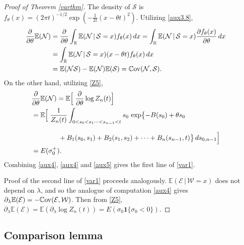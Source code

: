 \documentclass[11pt]{amsart}
\numberwithin{equation}{section}
\theoremstyle{remark}
\begin{document}
\begin{proof}[Proof of Theorem \ref{varthm}]
The density of ${{\mathcal S}}$ is 
$f_{\theta}(x)=(2\pi t)^{-1/2} \exp(-\frac1{2t}(x-{\theta} t)^2)$. 
Utilizing \eqref{aux3.8},  
\begin{equation}\begin{aligned}
\frac{\partial}{\partial{\theta}} {\mathbb{E}}({{\mathcal N}} )
&=\frac{\partial}{\partial{\theta}} \int_{\mathbb{R}} {\mathbb{E}}({{\mathcal N}} \,\vert\, {{\mathcal S}} =x) f_{\theta}(x)\,dx
=\int_{\mathbb{R}} {\mathbb{E}}({{\mathcal N}} \,\vert\, {{\mathcal S}} =x)  
\frac{\partial   f_{\theta}(x)}{\partial{\theta}}\,dx\\
&=\int_{\mathbb{R}} {\mathbb{E}}({{\mathcal N}} \,\vert\, {{\mathcal S}} =x) ( x-{\theta} t)f_{\theta}(x)\,dx\\
&={\mathbb{E}}({{\mathcal N}} {{\mathcal S}} )- {\mathbb{E}}({{\mathcal N}} ){\mathbb{E}}({{\mathcal S}}) =
{{\rm\mathbb{C}ov}}({{\mathcal N}} ,{{\mathcal S}} ). 
\end{aligned}\label{aux4}\end{equation}
On the other hand, utilizing \eqref{Z5},
\begin{equation}\begin{aligned}
&\frac{\partial}{\partial{\theta}} {\mathbb{E}}({{\mathcal N}} )
= {\mathbb{E}}\Bigl[\; \frac{\partial}{\partial{\theta}} \log Z_n(t)\Bigr] \\
&={\mathbb{E}}\Bigl[\; \frac1{ Z_n(t)} \int_{0<s_{0}<s_1\dotsm<s_{n-1}<t} 
s_0\, \exp\bigl\{ -B(s_0)+{\theta} s_0 \\[7pt]
 &\qquad\qquad   +  B_1(s_0,s_1) 
+B_{2}(s_1,s_{2}) +\dotsm + B_n(s_{n-1},t)\bigr\} \,ds_{0,n-1}\Bigr]\\
&=E(\sigma_0^+). 
\end{aligned}\label{aux5}\end{equation}
Combining \eqref{aux4}, \eqref{aux4} and \eqref{aux5} gives
the first line of  \eqref{var1}.

Proof of the second line of \eqref{var1} proceeds analogously. 
${\mathbb{E}}({{\mathcal E}}\,\vert\,{{\mathcal W}}=x)$ does not
depend on ${\lambda}$, and so the analogue of computation 
\eqref{aux4} gives $\partial_{\lambda} {\mathbb{E}}({{\mathcal E}}) = -{{\rm\mathbb{C}ov}}({{\mathcal E}}, {{\mathcal W}})$. 
Then from  \eqref{Z5},  $\partial_{\lambda} {\mathbb{E}}({{\mathcal E}}) 
={\mathbb{E}}(\partial_{\lambda} \log Z_n(t))
=E(\sigma_0{\mathbf{1}}\{\sigma_0<0\})$. 
\end{proof}
 
\subsection{Comparison lemma}
\end{document}
